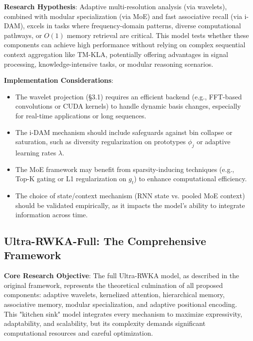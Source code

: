 \documentclass{article}
\begin{document}
\textbf{Research Hypothesis}: Adaptive multi-resolution analysis (via wavelets), combined with modular specialization (via MoE) and fast associative recall (via i-DAM), excels in tasks where frequency-domain patterns, diverse computational pathways, or $O(1)$ memory retrieval are critical. This model tests whether these components can achieve high performance without relying on complex sequential context aggregation like TM-KLA, potentially offering advantages in signal processing, knowledge-intensive tasks, or modular reasoning scenarios.

\textbf{Implementation Considerations}:
\begin{itemize}
    \item The wavelet projection (\S3.1) requires an efficient backend (e.g., FFT-based convolutions or CUDA kernels) to handle dynamic basis changes, especially for real-time applications or long sequences.
    \item The i-DAM mechanism should include safeguards against bin collapse or saturation, such as diversity regularization on prototypes $\phi_j$ or adaptive learning rates $\lambda$.
    \item The MoE framework may benefit from sparsity-inducing techniques (e.g., Top-K gating or L1 regularization on $g_t$) to enhance computational efficiency.
    \item The choice of state/context mechanism (RNN state vs. pooled MoE context) should be validated empirically, as it impacts the model's ability to integrate information across time.
\end{itemize}

\subsection{Ultra-RWKA-Full: The Comprehensive Framework}
\textbf{Core Research Objective}: The full Ultra-RWKA model, as described in the original framework, represents the theoretical culmination of all proposed components: adaptive wavelets, kernelized attention, hierarchical memory, associative memory, modular specialization, and adaptive positional encoding. This "kitchen sink" model integrates every mechanism to maximize expressivity, adaptability, and scalability, but its complexity demands significant computational resources and careful optimization.
\end{document}
